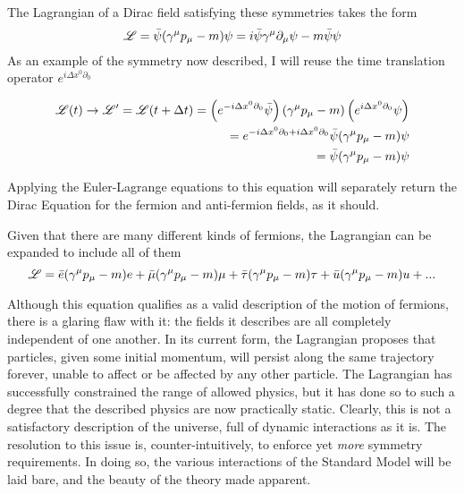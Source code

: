     The Lagrangian of a Dirac field satisfying these symmetries takes the form
    \begin{equation} \label{eq:basic_fermionL}
        \mathscr{L} = \bar{\psi} (\gamma^\mu p_\mu - m) \psi = i \bar{\psi} \gamma^\mu \partial_\mu \psi - m \bar{\psi} \psi
    \end{equation}
    As an example of the symmetry now described, I will reuse the time translation operator $e^{i\Delta x^0 \partial_0}$

    \begin{equation} \begin{split}
        \mathscr{L}(t) \to \mathscr{L}' = \mathscr{L}(t+\Delta t) =
            \left( e^{-i\Delta x^0 \partial_0} \bar{\psi} \right) (\gamma^\mu p_\mu - m) \left( e^{i\Delta x^0 \partial_0}\psi \right)
        \\  = e^{-i\Delta x^0 \partial_0 + i \Delta x^0 \partial_0} \bar{\psi} (\gamma^\mu p_\mu - m) \psi
        \\  = \bar{\psi} (\gamma^\mu p_\mu - m) \psi
    \end{split} \end{equation}

    Applying the Euler-Lagrange equations to this equation will separately return the Dirac Equation
        for the fermion and anti-fermion fields, as it should.

    Given that there are many different kinds of fermions, the Lagrangian can be expanded to include all of them
    \begin{equation}
        \mathscr{L} = \bar{e} (\gamma^\mu p_\mu - m) e
        + \bar{\mu} (\gamma^\mu p_\mu - m) \mu
        + \bar{\tau} (\gamma^\mu p_\mu - m) \tau
        + \bar{u} (\gamma^\mu p_\mu - m) u
        + ...
    \end{equation}

    Although this equation qualifies as a valid description of the motion of fermions,
        there is a glaring flaw with it: the fields it describes are all completely independent of one another.
    In its current form, the Lagrangian proposes that particles, given some initial momentum,
        will persist along the same trajectory forever, unable to affect or be affected by any other particle.
    The Lagrangian has successfully constrained the range of allowed physics,
        but it has done so to such a degree that the described physics are now practically static.
    Clearly, this is not a satisfactory description of the universe, full of dynamic interactions as it is.
    The resolution to this issue is, counter-intuitively, to enforce yet \textit{more} symmetry requirements.
    In doing so, the various interactions of the Standard Model will be laid bare,
        and the beauty of the theory made apparent.

